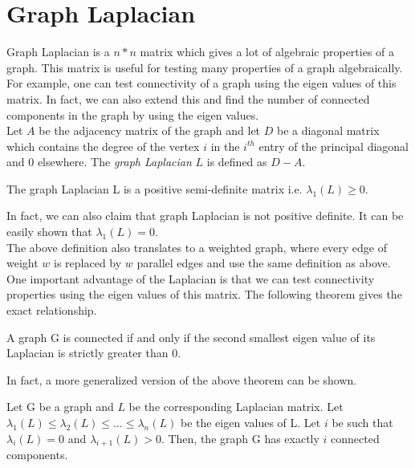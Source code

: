 \documentclass[BTech]{iitmdiss}
\begin{document}
	    \section{Graph Laplacian}
		Graph Laplacian is a $n \ast n$ matrix which gives a lot of algebraic properties of a graph. This matrix is useful for testing many properties
		of a graph algebraically. For example, one can test connectivity of a graph using the eigen values of this matrix. In fact, we can also extend
		this and find the number of connected components in the graph by using the eigen values. \\
		
		Let $A$ be the adjacency matrix of the graph and let $D$ be a diagonal matrix which contains the degree of the vertex $i$ in the 
		$i^{th}$ entry of the principal diagonal and 0 elsewhere. The \textit{graph Laplacian} $L$ is defined as $D - A$. \\
		
		\begin{prop}
		The graph Laplacian L is a positive semi-definite matrix i.e. $\lambda_1(L) \geq 0$.
		 
		\end{prop}

		
		In fact, we can also claim that graph Laplacian is not positive definite. It can be easily shown that $\lambda_1(L) = 0$. \\
		
		The above definition also translates to a weighted graph, where every edge of weight $w$ is replaced by $w$ parallel edges and use the 
		same definition as above. \\
		
		One important advantage of the Laplacian is that we can test connectivity properties using the eigen values of this matrix. The 
		following theorem gives the exact relationship. \\
		
		\begin{thm}
		A graph G is connected if and only if the second smallest eigen value of its Laplacian is strictly greater than 0. 
		\end{thm}
		
		In fact, a more generalized version of the above theorem can be shown. \\
		
		\begin{thm}
		Let G be a graph and $L$ be the corresponding Laplacian matrix. Let $\lambda_1(L) \leq \lambda_2(L) \leq \ldots \leq \lambda_n(L)$ be the
		eigen values of L. Let $i$ be such that $\lambda_{i}(L) = 0 $ and $\lambda_{i+1}(L) > 0$.
		Then, the graph G has exactly $i$ connected components. 
		\end{thm}
		
\end{document}
